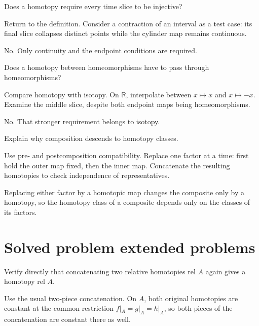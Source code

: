 \begin{exercise}\label{exr:viii01-22}
Does a homotopy require every time slice to be injective?
\end{exercise}
\begin{hint}Return to the definition.
Consider a contraction of an interval as a test case: its final slice collapses distinct points while the cylinder map remains continuous.
\end{hint}
\begin{solution}
No.  Only continuity and the endpoint conditions are required.
\end{solution}

\begin{exercise}\label{exr:viii01-23}
Does a homotopy between homeomorphisms have to pass through homeomorphisms?
\end{exercise}
\begin{hint}Compare homotopy with isotopy.
On \(\mathbb R\), interpolate between \(x\mapsto x\) and \(x\mapsto -x\). Examine the middle slice, despite both endpoint maps being homeomorphisms.
\end{hint}
\begin{solution}
No.  That stronger requirement belongs to isotopy.
\end{solution}

\begin{exercise}\label{exr:viii01-24}
Explain why composition descends to homotopy classes.
\end{exercise}
\begin{hint}Use pre- and postcomposition compatibility.
Replace one factor at a time: first hold the outer map fixed, then the inner map. Concatenate the resulting homotopies to check independence of representatives.
\end{hint}
\begin{solution}
Replacing either factor by a homotopic map changes the composite only by a
homotopy, so the homotopy class of a composite depends only on the classes of
its factors.
\end{solution}

\section{Solved problem extended problems}

\begin{problem}\label{prob:viii01-01}
Verify directly that concatenating two relative homotopies rel \(A\) again gives
a homotopy rel \(A\).
\end{problem}
\begin{solution}
Use the usual two-piece concatenation.  On \(A\), both original homotopies are
constant at the common restriction \(f|_A=g|_A=h|_A\), so both pieces of the
concatenation are constant there as well.
\end{solution}

